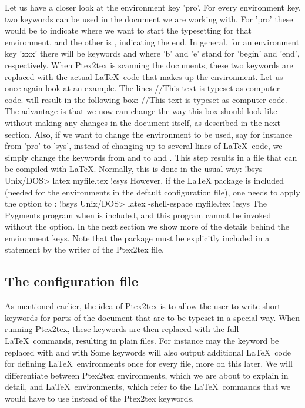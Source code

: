 \documentclass[a4paper,11pt]{article}
\begin{document}
{Let us have a closer look at the environment key 'pro'. For every environment
key, two keywords can be used in the document we are working with. For 'pro'
these would be \code{\bpro} to indicate where we want to start the
typesetting for that environment, and the other is \code{\epro},
indicating the end. In general, for an environment key 'xxx' there will be
keywords \code{\bxxx} and \code{\exxx} where 'b' and 'e' stand
for 'begin' and 'end', respectively. When Ptex2tex is scanning the
documents, these two keywords are replaced with the actual \LaTeX~code that
makes up the environment. Let us once again look at an example. The lines
\bdat
 \bpro
 //This text is typeset as computer code.
 \epro
\edat
will result in the following box:
\bpro
//This text is typeset as computer code.
\epro
The advantage is that we now can change the way this box should look like
without making any changes in the document itself, as described in the next
section. Also, if we want to change the environment to be used, say for
instance from 'pro' to 'sys', instead of changing up to several lines of
\LaTeX~code, we simply change the keywords from  \code{\bpro} and
\code{\epro} to \code{\bsys} and \code{\esys}.
This step results in a  file that can be compiled with \LaTeX.
Normally, this is done in the usual way:
!bsys
Unix/DOS> latex myfile.tex
!esys
However, if the  \LaTeX{} package is included (needed for the
 environments in the default 
configuration file), one needs to apply
the  option to :
!bsys
Unix/DOS> latex -shell-espace myfile.tex
!esys
The Pygments program when  is included, and this
program cannot be invoked without the  option.  In
the next section we show more of the details behind the environment
keys. Note that the  package must be explicitly
included in a  statement by the writer of the Ptex2tex file.

\subsection{The configuration file}\label{sec:conffile}
As mentioned earlier, the idea of Ptex2tex is to allow the user to write short keywords for
parts of the document that are to be typeset in a special way. When running
Ptex2tex, these keywords are then replaced with the full
\LaTeX~commands, resulting in plain  files. For instance may the
keyword \code{\bpy} be replaced with
\bdat
\plin
\edat
and
\code{\epy} with
\bdat
\elin
\edat
Some keywords will also output additional \LaTeX~code for defining
\LaTeX~environments once for every file, more on this later. We will differentiate
between Ptex2tex environments, which we are about to explain in detail,
and \LaTeX~environments, which refer to the \LaTeX~commands that we would
have to use instead of the Ptex2tex keywords.

}
\end{document}
